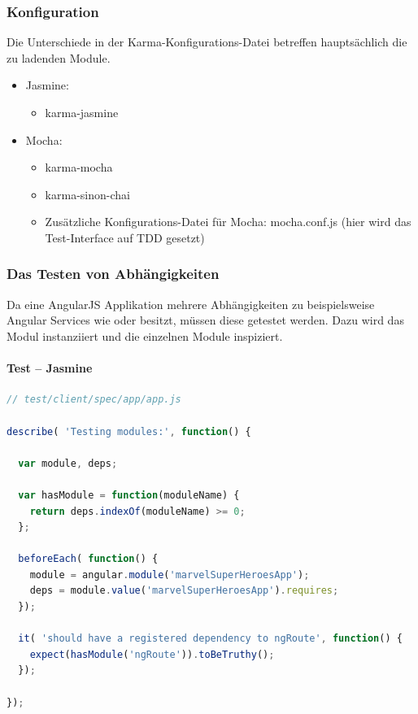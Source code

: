 \subsubsection{Konfiguration}
Die Unterschiede in der Karma-Konfigurations-Datei betreffen hauptsächlich die zu ladenden Module.
\begin{itemize}
  \item Jasmine:
    \begin{itemize}
      \item karma-jasmine
    \end{itemize}
  \item Mocha:
    \begin{itemize}
      \item karma-mocha
      \item karma-sinon-chai
      \item Zusätzliche Konfigurations-Datei für Mocha: mocha.conf.js (hier wird das Test-Interface auf TDD gesetzt)
    \end{itemize}
\end{itemize}

\newpage
\subsubsection{Das Testen von Abhängigkeiten}
Da eine AngularJS Applikation mehrere Abhängigkeiten zu beispielsweise Angular Services wie  oder  besitzt, müssen diese getestet werden. Dazu wird das Modul  instanziiert und die einzelnen Module inspiziert.

\paragraph{Test -- Jasmine}
\begin{lstlisting}[language=JavaScript, caption=TDD AngularJS - Dependencies - Jasmine]
// test/client/spec/app/app.js

describe( 'Testing modules:', function() {

  var module, deps;

  var hasModule = function(moduleName) {
    return deps.indexOf(moduleName) >= 0;
  };

  beforeEach( function() {
    module = angular.module('marvelSuperHeroesApp');
    deps = module.value('marvelSuperHeroesApp').requires;
  });

  it( 'should have a registered dependency to ngRoute', function() {
    expect(hasModule('ngRoute')).toBeTruthy();
  });

});
\end{lstlisting}

